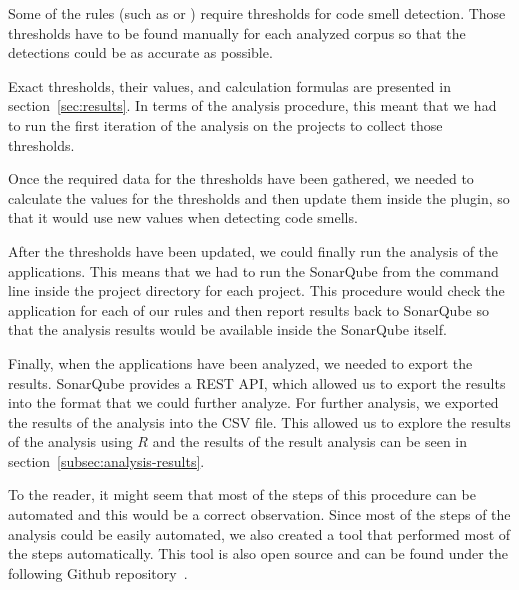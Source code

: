 Some of the rules (such as  or ) require thresholds for code smell detection.
Those thresholds have to be found manually for each analyzed corpus so that the detections could be as accurate
as possible.

Exact thresholds, their values, and calculation formulas are presented in section~\ref{sec:results}.
In terms of the analysis procedure, this meant that we had to run the first iteration of the analysis
on the projects to collect those thresholds.

Once the required data for the thresholds have been gathered, we needed to calculate the values
for the thresholds and then update them inside the plugin, so that it would use new values
when detecting code smells.

After the thresholds have been updated, we could finally run the analysis of the applications.
This means that we had to run the SonarQube from the command line inside the project directory for each project.
This procedure would check the application for each of our rules and then report results back to SonarQube so that
the analysis results would be available inside the SonarQube itself.

Finally, when the applications have been analyzed, we needed to export the results.
SonarQube provides a REST API, which allowed us to export the results into the format that
we could further analyze.
For further analysis, we exported the results of the analysis into the CSV file.
This allowed us to explore the results of the analysis using $R$ and the results of the result analysis
can be seen in section~\ref{subsec:analysis-results}.

To the reader, it might seem that most of the steps of this procedure can be automated and this would be a correct
observation.
Since most of the steps of the analysis could be easily automated, we also created a tool that performed
most of the steps automatically.
This tool is also open source and can be found under the following Github repository~\cite{bulk_analyzer}.
